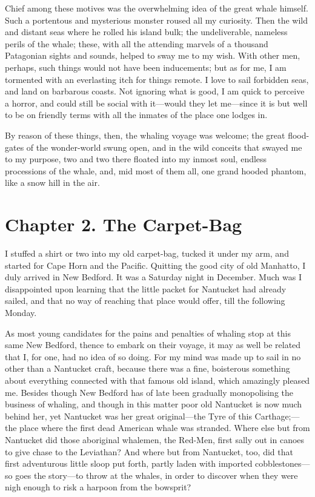 \documentclass[12pt,ebook,oneside,openany]{memoir} %
\begin{document}
Chief among these motives was the overwhelming idea of the great whale himself. Such a portentous and mysterious monster roused all my curiosity. Then the wild and distant seas where he rolled his island bulk; the undeliverable, nameless perils of the whale; these, with all the attending marvels of a thousand Patagonian sights and sounds, helped to sway me to my wish. With other men, perhaps, such things would not have been inducements; but as for me, I am tormented with an everlasting itch for things remote. I love to sail forbidden seas, and land on barbarous coasts. Not ignoring what is good, I am quick to perceive a horror, and could still be social with it—would they let me—since it is but well to be on friendly terms with all the inmates of the place one lodges in.

By reason of these things, then, the whaling voyage was welcome; the great flood-gates of the wonder-world swung open, and in the wild conceits that swayed me to my purpose, two and two there floated into my inmost soul, endless processions of the whale, and, mid most of them all, one grand hooded phantom, like a snow hill in the air.

\chapter{Chapter 2. The Carpet-Bag}

I stuffed a shirt or two into my old carpet-bag, tucked it under my arm, and started for Cape Horn and the Pacific. Quitting the good city of old Manhatto, I duly arrived in New Bedford. It was a Saturday night in December. Much was I disappointed upon learning that the little packet for Nantucket had already sailed, and that no way of reaching that place would offer, till the following Monday.

As most young candidates for the pains and penalties of whaling stop at this same New Bedford, thence to embark on their voyage, it may as well be related that I, for one, had no idea of so doing. For my mind was made up to sail in no other than a Nantucket craft, because there was a fine, boisterous something about everything connected with that famous old island, which amazingly pleased me. Besides though New Bedford has of late been gradually monopolising the business of whaling, and though in this matter poor old Nantucket is now much behind her, yet Nantucket was her great original—the Tyre of this Carthage;—the place where the first dead American whale was stranded. Where else but from Nantucket did those aboriginal whalemen, the Red-Men, first sally out in canoes to give chase to the Leviathan? And where but from Nantucket, too, did that first adventurous little sloop put forth, partly laden with imported cobblestones—so goes the story—to throw at the whales, in order to discover when they were nigh enough to risk a harpoon from the bowsprit?
\end{document}
